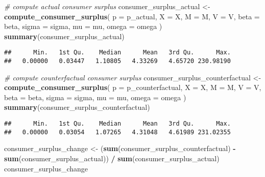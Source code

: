 \documentclass[
]{book}
\newenvironment{Shaded}{\begin{snugshade}}{\end{snugshade}}
\newcommand{\AttributeTok}[1]{\textcolor[rgb]{0.13,0.29,0.53}{#1}}
\newcommand{\CommentTok}[1]{\textcolor[rgb]{0.56,0.35,0.01}{\textit{#1}}}
\newcommand{\FunctionTok}[1]{\textcolor[rgb]{0.13,0.29,0.53}{\textbf{#1}}}
\newcommand{\NormalTok}[1]{#1}
\newcommand{\OtherTok}[1]{\textcolor[rgb]{0.56,0.35,0.01}{#1}}
\newcommand{\SpecialCharTok}[1]{\textcolor[rgb]{0.81,0.36,0.00}{\textbf{#1}}}
\begin{document}
\begin{Shaded}
\begin{Highlighting}[]
\CommentTok{\# compute actual consumer surplus}
\NormalTok{consumer\_surplus\_actual }\OtherTok{\textless{}{-}} 
  \FunctionTok{compute\_consumer\_surplus}\NormalTok{(}
    \AttributeTok{p =}\NormalTok{ p\_actual, }
    \AttributeTok{X =}\NormalTok{ X, }
    \AttributeTok{M =}\NormalTok{ M, }
    \AttributeTok{V =}\NormalTok{ V, }
    \AttributeTok{beta =}\NormalTok{ beta, }
    \AttributeTok{sigma =}\NormalTok{ sigma, }
    \AttributeTok{mu =}\NormalTok{ mu, }
    \AttributeTok{omega =}\NormalTok{ omega}
\NormalTok{    )}
\FunctionTok{summary}\NormalTok{(consumer\_surplus\_actual)}
\end{Highlighting}
\end{Shaded}

\begin{verbatim}
##      Min.   1st Qu.    Median      Mean   3rd Qu.      Max. 
##   0.00000   0.03447   1.10805   4.33269   4.65720 230.98190
\end{verbatim}

\begin{Shaded}
\begin{Highlighting}[]
\CommentTok{\# compute counterfactual consumer surplus}
\NormalTok{consumer\_surplus\_counterfactual }\OtherTok{\textless{}{-}} 
  \FunctionTok{compute\_consumer\_surplus}\NormalTok{(}
    \AttributeTok{p =}\NormalTok{ p\_counterfactual, }
    \AttributeTok{X =}\NormalTok{ X, }
    \AttributeTok{M =}\NormalTok{ M, }
    \AttributeTok{V =}\NormalTok{ V, }
    \AttributeTok{beta =}\NormalTok{ beta, }
    \AttributeTok{sigma =}\NormalTok{ sigma, }
    \AttributeTok{mu =}\NormalTok{ mu, }
    \AttributeTok{omega =}\NormalTok{ omega}
\NormalTok{    )}
\FunctionTok{summary}\NormalTok{(consumer\_surplus\_counterfactual)}
\end{Highlighting}
\end{Shaded}

\begin{verbatim}
##      Min.   1st Qu.    Median      Mean   3rd Qu.      Max. 
##   0.00000   0.03054   1.07265   4.31048   4.61989 231.02355
\end{verbatim}

\begin{Shaded}
\begin{Highlighting}[]
\NormalTok{consumer\_surplus\_change }\OtherTok{\textless{}{-}} 
\NormalTok{  (}\FunctionTok{sum}\NormalTok{(consumer\_surplus\_counterfactual) }\SpecialCharTok{{-}} 
     \FunctionTok{sum}\NormalTok{(consumer\_surplus\_actual)) }\SpecialCharTok{/}
  \FunctionTok{sum}\NormalTok{(consumer\_surplus\_actual)}
\NormalTok{consumer\_surplus\_change}
\end{Highlighting}
\end{Shaded}
\end{document}
